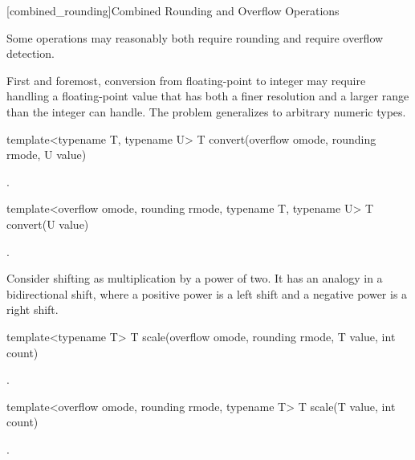 \begin{addedblock}
[combined_rounding]{Combined Rounding and Overflow Operations}

Some operations may reasonably both require rounding and require overflow detection.

First and foremost, conversion from floating-point to integer may require handling a floating-point value that has both a finer resolution and a larger range than the integer can handle. The problem generalizes to arbitrary numeric types.

\begin{itemdecl}
template<typename T, typename U> T convert(overflow omode, rounding rmode, U value)		
\end{itemdecl}

\begin{itemdescr}
\returns {}.	
\end{itemdescr}

\begin{itemdecl}
template<overflow omode, rounding rmode, typename T, typename U> T convert(U value)		
\end{itemdecl}

\begin{itemdescr}
\returns {}.	
\end{itemdescr}

Consider shifting as multiplication by a power of two. It has an analogy in a bidirectional shift, where a positive power is a left shift and a negative power is a right shift.

\begin{itemdecl}
template<typename T> T scale(overflow omode, rounding rmode, T value, int count)		
\end{itemdecl}

\begin{itemdescr}
\returns {}.	
\end{itemdescr}

\begin{itemdecl}
template<overflow omode, rounding rmode, typename T> T scale(T value, int count)		
\end{itemdecl}

\begin{itemdescr}
\returns {}.	
\end{itemdescr}


\end{addedblock}
